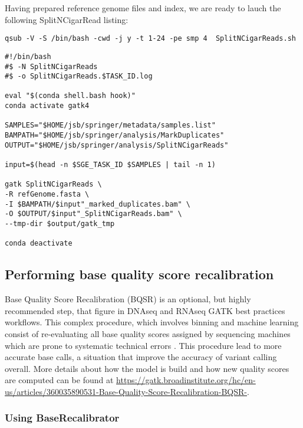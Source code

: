 Having prepared reference genome files and index, we are ready to lauch the following SplitNCigarRead listing:


\begin{verbatim}
qsub -V -S /bin/bash -cwd -j y -t 1-24 -pe smp 4  SplitNCigarReads.sh
\end{verbatim}



\begin{verbatim}
#!/bin/bash
#$ -N SplitNCigarReads
#$ -o SplitNCigarReads.$TASK_ID.log
	
eval "$(conda shell.bash hook)"
conda activate gatk4
	
SAMPLES="$HOME/jsb/springer/metadata/samples.list"
BAMPATH="$HOME/jsb/springer/analysis/MarkDuplicates"
OUTPUT="$HOME/jsb/springer/analysis/SplitNCigarReads"
	
input=$(head -n $SGE_TASK_ID $SAMPLES | tail -n 1)

gatk SplitNCigarReads \
-R refGenome.fasta \
-I $BAMPATH/$input"_marked_duplicates.bam" \
-O $OUTPUT/$input"_SplitNCigarReads.bam" \
--tmp-dir $output/gatk_tmp
	
conda deactivate
\end{verbatim}



\subsection{Performing base quality score recalibration}

Base Quality Score Recalibration (BQSR) is an optional, but highly recommended step, that figure in DNAseq and RNAseq GATK best practices workflows. This complex procedure, which involves binning and machine learning consist of re-evaluating all base quality scores assigned by sequencing machines which are prone to systematic technical errors \cite{GATK_BaseQuality}. This procedure lead to more accurate base calls, a situation that improve the accuracy of variant calling overall. More details about how the model is build and how new quality scores are computed can be found at \href{https://gatk.broadinstitute.org/hc/en-us/articles/360035890531-Base-Quality-Score-Recalibration-BQSR-}{https://gatk.broadinstitute.org/hc/en-us/articles/360035890531-Base-Quality-Score-Recalibration-BQSR-}.

\subsubsection{Using BaseRecalibrator}

